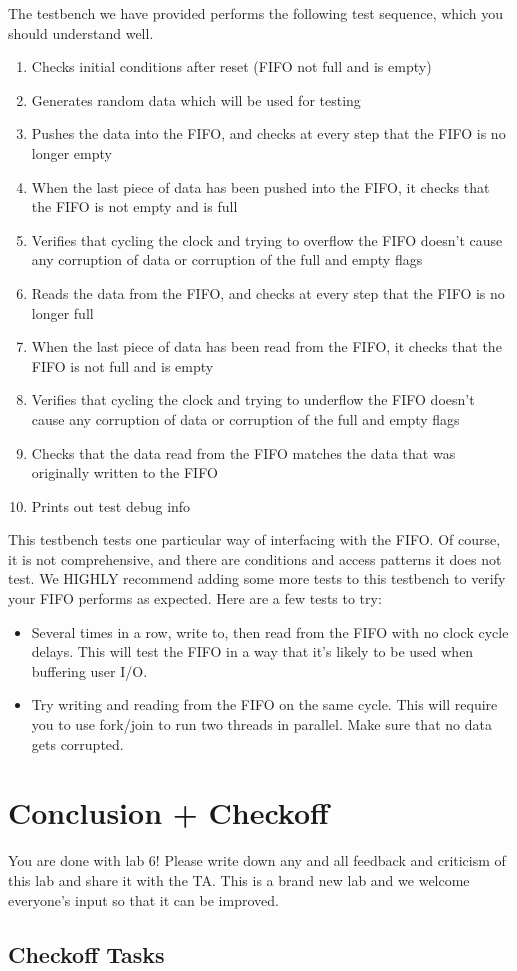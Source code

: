 \documentclass[11pt]{article}
\begin{document}
The testbench we have provided performs the following test sequence, which you should understand well.
\begin{enumerate}
	\item Checks initial conditions after reset (FIFO not full and is empty)
	\item Generates random data which will be used for testing
	\item Pushes the data into the FIFO, and checks at every step that the FIFO is no longer empty
	\item When the last piece of data has been pushed into the FIFO, it checks that the FIFO is not empty and is full
	\item Verifies that cycling the clock and trying to overflow the FIFO doesn't cause any corruption of data or corruption of the full and empty flags
	\item Reads the data from the FIFO, and checks at every step that the FIFO is no longer full
	\item When the last piece of data has been read from the FIFO, it checks that the FIFO is not full and is empty
	\item Verifies that cycling the clock and trying to underflow the FIFO doesn't cause any corruption of data or corruption of the full and empty flags
	\item Checks that the data read from the FIFO matches the data that was originally written to the FIFO
	\item Prints out test debug info
\end{enumerate}

This testbench tests one particular way of interfacing with the FIFO. Of course, it is not comprehensive, and there are conditions and access patterns it does not test. We HIGHLY recommend adding some more tests to this testbench to verify your FIFO performs as expected. Here are a few tests to try:

\begin{itemize}
	\item Several times in a row, write to, then read from the FIFO with no clock cycle delays. This will test the FIFO in a way that it's likely to be used when buffering user I/O.
	\item Try writing and reading from the FIFO on the same cycle. This will require you to use fork/join to run two threads in parallel. Make sure that no data gets corrupted.
\end{itemize}
\section{Conclusion + Checkoff}
You are done with lab 6! Please write down any and all feedback and criticism of this lab and share it with the TA. This is a brand new lab and we welcome everyone's input so that it can be improved.


\subsection{Checkoff Tasks}
\end{document}
